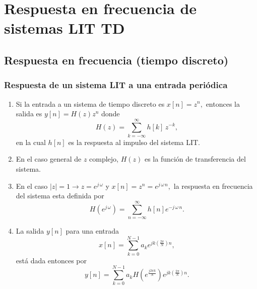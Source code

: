 \chapter{Respuesta en frecuencia de sistemas LIT TD}

\section{Respuesta en frecuencia (tiempo discreto)}

\subsection{Respuesta de un sistema LIT a una entrada peri\'{o}dica}

\begin{enumerate}

\item Si la entrada a un sistema de tiempo discreto es $x\left[ n\right] = z^n,$
entonces la salida es $y\left[ n\right] =H\left( z\right) z^n$ donde
\begin{equation}
  H\left( z\right) =\sum_{k=-\infty }^{\infty }h\left[ k\right] \, z^{-k},
\end{equation}
en la cual $h\left[ n\right] $ es la respuesta al impulso del sistema LIT.

\item En el caso general de $z$ complejo, $H\left( z\right) $ es la funci\'{o}n
de transferencia del sistema. 

\item En el caso $\left| z\right| =1\rightarrow z=e^{j \, \omega}$ y 
$x\left[ n\right] =z^n=e^{j \, \omega \, n},$ la respuesta en frecuencia del
sistema esta definida por 
\begin{equation}
H\left( e^{j \, \omega }\right) =\sum_{n=-\infty }^{\infty }h\left[ n\right]e^{-j \, \omega \, n}.
\end{equation}

\item La salida $y\left[ n\right] $ para una entrada 
\begin{equation}
x\left[ n\right] =\sum_{k=0}^{N-1}a_{k}e^{jk\left( \frac{2\pi }{N}\right) n},
\end{equation}
est\'{a} dada entonces por 
\begin{equation}
  y\left[ n\right] =
  \sum_{k=0}^{N-1}a_{k}H\left( e^{\frac{j2\pi k}{N}}\right)e^{jk\left( \frac{2\pi }{N}\right) n}.
\end{equation}

\end{enumerate}


